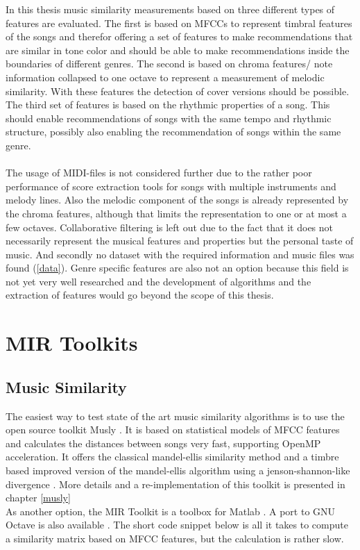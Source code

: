 In this thesis music similarity measurements based on three different types of features are evaluated. 
The first is based on MFCCs to represent timbral features of the songs and therefor offering a set of features to make recommendations that are similar in tone color and should be able to make recommendations inside the boundaries of different genres.
The second is based on chroma features/ note information collapsed to one octave to represent a measurement of melodic similarity. With these features the detection of cover versions should be possible.  
The third set of features is based on the rhythmic properties of a song. This should enable recommendations of songs with the same tempo and rhythmic structure, possibly also enabling the recommendation of songs within the same genre.\ \\
\ \\
The usage of MIDI-files is not considered further due to the rather poor performance of score extraction tools for songs with multiple instruments and melody lines. Also the melodic component of the songs is already represented by the chroma features, although that limits the representation to one or at most a few octaves. 
Collaborative filtering is left out due to the fact that it does not necessarily represent the musical features and properties but the personal taste of music. And secondly no dataset with the required information and music files was found (\ref{data}). 
Genre specific features are also not an option because this field is not yet very well researched and the development of algorithms and the extraction of features would go beyond the scope of this thesis.


\section{MIR Toolkits}\label{mirtoolkit}
\subsection{Music Similarity}

The easiest way to test state of the art music similarity algorithms is to use the open source toolkit Musly \cite{musly1}. It is based on statistical models of MFCC features and calculates the distances between songs very fast, supporting OpenMP acceleration. It offers the classical mandel-ellis similarity method \cite{mandelellis1} and a timbre based improved version of the mandel-ellis algorithm using a jenson-shannon-like divergence \cite{musly2}. More details and a re-implementation of this toolkit is presented in chapter \ref{musly}\\
As another option, the MIR Toolkit \cite{mirtoolbox1} is a toolbox for Matlab \cite{matl1}. A port to GNU Octave \cite{octave1} is also available \cite{mirtoolbox2}. The short code snippet below is all it takes to compute a similarity matrix based on MFCC features, but the calculation is rather slow.

